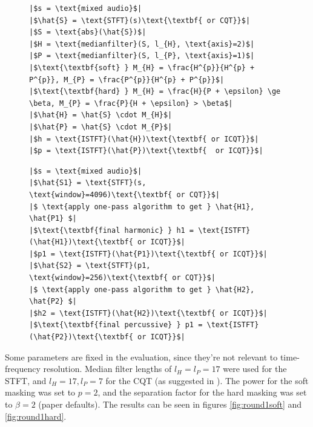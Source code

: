 \documentclass[letter,12pt]{article}
\newlength{\mintednumbersep}
\begin{document}
\begin{figure}[h]
  \centering
 \begin{minipage}{0.48\textwidth}
  \centering
\begin{verbatim}
|$s = \text{mixed audio}$|
|$\hat{S} = \text{STFT}(s)\text{\textbf{ or CQT}}$|
|$S = \text{abs}(\hat{S})$|
|$H = \text{medianfilter}(S, l_{H}, \text{axis}=2)$|
|$P = \text{medianfilter}(S, l_{P}, \text{axis}=1)$|
|$\text{\textbf{soft} } M_{H} = \frac{H^{p}}{H^{p} + P^{p}}, M_{P} = \frac{P^{p}}{H^{p} + P^{p}}$|
|$\text{\textbf{hard} } M_{H} = \frac{H}{P + \epsilon} \ge \beta, M_{P} = \frac{P}{H + \epsilon} > \beta$|
|$\hat{H} = \hat{S} \cdot M_{H}$|
|$\hat{P} = \hat{S} \cdot M_{P}$|
|$h = \text{ISTFT}(\hat{H})\text{\textbf{ or ICQT}}$|
|$p = \text{ISTFT}(\hat{P})\text{\textbf{  or ICQT}}$|
\end{verbatim}
 \end{minipage}
\hspace{0.02\textwidth}
 \begin{minipage}{0.48\textwidth}
  \centering
\begin{verbatim}
|$s = \text{mixed audio}$|
|$\hat{S1} = \text{STFT}(s, \text{window}=4096)\text{\textbf{ or CQT}}$|
|$ \text{apply one-pass algorithm to get } \hat{H1}, \hat{P1} $|
|$\text{\textbf{final harmonic} } h1 = \text{ISTFT}(\hat{H1})\text{\textbf{ or ICQT}}$|
|$p1 = \text{ISTFT}(\hat{P1})\text{\textbf{ or ICQT}}$|
|$\hat{S2} = \text{STFT}(p1, \text{window}=256)\text{\textbf{ or CQT}}$|
|$ \text{apply one-pass algorithm to get } \hat{H2}, \hat{P2} $|
|$h2 = \text{ISTFT}(\hat{H2})\text{\textbf{ or ICQT}}$|
|$\text{\textbf{final percussive} } p1 = \text{ISTFT}(\hat{P2})\text{\textbf{ or ICQT}}$|
\end{verbatim}
 \end{minipage}
  \label{code:pseudocodes}
\end{figure}

Some parameters are fixed in the evaluation, since they're not relevant to time-frequency resolution. Median filter lengths of $l_{H} = l_{P} = 17$ were used for the STFT, and $l_{H} = 17, l_{P} = 7$ for the CQT (as suggested in \cite{fitzgerald2}). The power for the soft masking was set to $p = 2$, and the separation factor for the hard masking was set to $\beta = 2$ (paper defaults). The results can be seen in figures \ref{fig:round1soft} and \ref{fig:round1hard}.
\end{document}
